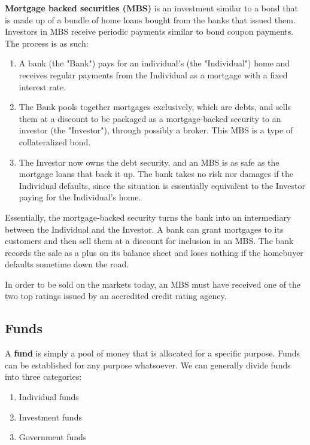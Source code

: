 \documentclass{article}
\begin{document}
    \begin{definition}[MBS]
      \textbf{Mortgage backed securities (MBS)} is an investment similar to a bond that is made up of a bundle of home loans bought from the banks that issued them. Investors in MBS receive periodic payments similar to bond coupon payments. The process is as such: 
      \begin{enumerate}
        \item A bank (the "Bank") pays for an individual's (the "Individual") home and receives regular payments from the Individual as a mortgage with a fixed interest rate. 
        \item The Bank pools together mortgages exclusively, which are debts, and sells them at a discount to be packaged as a mortgage-backed security to an investor (the "Investor"), through possibly a broker. This MBS is a type of collateralized bond. 
        \item The Investor now owns the debt security, and an MBS is as safe as the mortgage loans that back it up. The bank takes no risk nor damages if the Individual defaults, since the situation is essentially equivalent to the Investor paying for the Individual's home. 
      \end{enumerate}
      Essentially, the mortgage-backed security turns the bank into an intermediary between the Individual and the Investor. A bank can grant mortgages to its customers and then sell them at a discount for inclusion in an MBS. The bank records the sale as a plus on its balance sheet and loses nothing if the homebuyer defaults sometime down the road. 

      In order to be sold on the markets today, an MBS must have received one of the two top ratings issued by an accredited credit rating agency. 
    \end{definition}

  \subsection{Funds}

    \begin{definition}[Funds]
      A \textbf{fund} is simply a pool of money that is allocated for a specific purpose. Funds can be established for any purpose whatsoever. We can generally divide funds into three categories: 
      \begin{enumerate}
        \item Individual funds
        \item Investment funds
        \item Government funds
      \end{enumerate}
    \end{definition}
\end{document}
